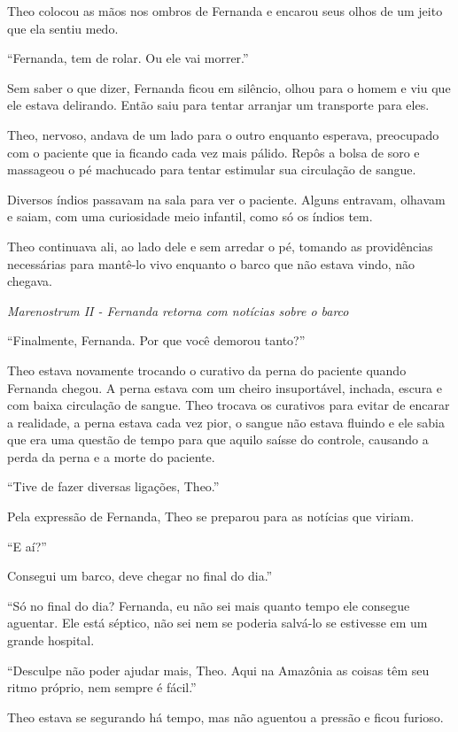 Theo colocou as mãos nos ombros de Fernanda e encarou seus olhos de um
jeito que ela sentiu medo.

``Fernanda, tem de rolar. Ou ele vai morrer.''

Sem saber o que dizer, Fernanda ficou em silêncio, olhou para o homem e
viu que ele estava delirando. Então saiu para tentar arranjar um
transporte para eles.

Theo, nervoso, andava de um lado para o outro enquanto esperava,
preocupado com o paciente que ia ficando cada vez mais pálido. Repôs a
bolsa de soro e massageou o pé machucado para tentar estimular sua
circulação de sangue.

Diversos índios passavam na sala
para ver o paciente. Alguns entravam, olhavam e saiam, com uma
curiosidade meio infantil, como só os índios tem.

Theo continuava ali, ao lado dele e sem
arredar o pé, tomando as providências necessárias para mantê-lo vivo
enquanto o barco que não estava vindo, não chegava.

\asterisc

\emph{Marenostrum II - Fernanda retorna com notícias sobre o barco}

``Finalmente, Fernanda. Por que você demorou tanto?''

Theo estava novamente trocando o curativo da perna do paciente quando
Fernanda chegou. A perna estava com um cheiro insuportável, inchada,
escura e com baixa circulação de sangue. Theo trocava os curativos para
evitar de encarar a realidade, a perna estava cada vez pior, o sangue
não estava fluindo e ele sabia que era uma questão de tempo para que
aquilo saísse do controle, causando a perda da perna e a morte do
paciente.

``Tive de fazer diversas ligações, Theo.''

Pela expressão de Fernanda, Theo se preparou para as notícias que
viriam.

``E aí?''

Consegui um barco, deve chegar no final do dia.''

``Só no final do dia? Fernanda, eu não sei mais quanto tempo ele
consegue aguentar. Ele está séptico, não sei nem se poderia salvá-lo se
estivesse em um grande hospital.

``Desculpe não poder ajudar mais, Theo. Aqui na Amazônia as coisas têm
seu ritmo próprio, nem sempre é fácil.''

Theo estava se segurando há tempo, mas não aguentou a pressão e ficou
furioso.

